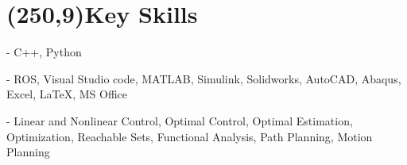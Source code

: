 \documentclass[10pt,a4paper]{extarticle}
\begin{document}
\section*{\colorbox{gray!10}{\makebox(250,9){\textcolor{blue!65}{Key Skills\hfill}}}}
\begin{description}[align=left,labelwidth=1.8cm,leftmargin = 2.25cm]
\setlength\itemsep{-0.25em}
\item[Language ] - C++, Python
\item[Softwares ] - ROS, Visual Studio code, MATLAB, Simulink, Solidworks, AutoCAD, Abaqus, Excel, LaTeX, MS Office
\item[Skills ]  - Linear and Nonlinear Control, Optimal Control, Optimal Estimation, Optimization, Reachable Sets, Functional Analysis, Path Planning, Motion Planning
\end{description}
\vspace{-0.3cm}
\end{document}
